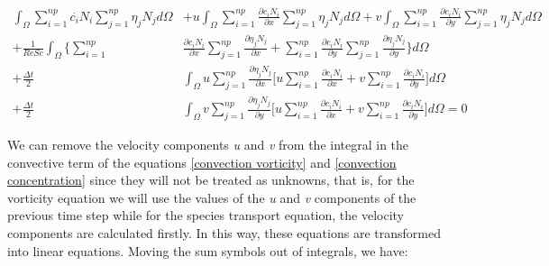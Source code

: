 \medskip
\begin{equation} \label{convection concentration}
 \begin{aligned} 
  \int_{\Omega} \sum\limits_{i=1}^{np} \overset{.}{c_i} N_i 
                \sum\limits_{j=1}^{np} \eta_j N_j d\Omega 
  & + u \int_{\Omega} \sum\limits_{i=1}^{np} \frac{\partial c_i N_i}{\partial x} 
                    \sum\limits_{j=1}^{np} \eta_j N_j d\Omega 
  + v \int_{\Omega} \sum\limits_{i=1}^{np} \frac{\partial c_i N_i}{\partial y} 
                    \sum\limits_{j=1}^{np} \eta_j N_j d\Omega 
  \\[5pt]
  + \frac{1}{\textit{ReSc}} \int_{\Omega} \Bigg\{ 
                    \sum\limits_{i=1}^{np} & \frac{\partial c_i N_i}{\partial x} 
                    \sum\limits_{j=1}^{np} \frac{\partial \eta_j N_j}{\partial x} 
  +                 \sum\limits_{i=1}^{np} \frac{\partial c_i N_i}{\partial y} 
                    \sum\limits_{j=1}^{np} \frac{\partial \eta_j N_j}{\partial y} \Bigg\} d\Omega
 \\[5pt]
 + \frac{\Delta t}{2} & \int_{\Omega} u \sum\limits_{j=1}^{np} \frac{\partial \eta_j N_j}{\partial x}
 \Bigg[
   u \sum\limits_{i=1}^{np} \frac{\partial c_i N_i}{\partial x}
 + v \sum\limits_{i=1}^{np} \frac{\partial c_i N_i}{\partial y}
 \Bigg] d\Omega
 \\[5pt] 
 + \frac{\Delta t}{2} & \int_{\Omega} v \sum\limits_{j=1}^{np} \frac{\partial \eta_j N_j}{\partial y}
 \Bigg[
   u \sum\limits_{i=1}^{np} \frac{\partial c_i N_i}{\partial x}
 + v \sum\limits_{i=1}^{np} \frac{\partial c_i N_i}{\partial y}
 \Bigg] d\Omega = 0
 \end{aligned}
\end{equation}

We can remove the velocity components \textit{u} and \textit{v} 
from the integral in the convective term of 
the equations \ref{convection vorticity} and 
\ref{convection concentration} since they will not be treated as 
unknowns, that is, for the vorticity equation we will use 
the values of the \textit{u} and \textit{v} components 
of the previous time step while for the species transport equation, 
the velocity components are calculated firstly. 
In this way, these equations are transformed into linear equations.
Moving the sum symbols out of integrals, we have:

